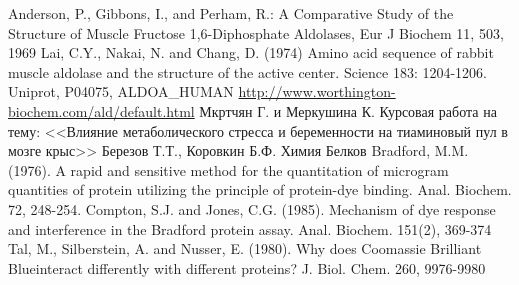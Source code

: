 \begin{thebibliography}{WW}
 Anderson, P., Gibbons, I., and Perham, R.:
    A Comparative Study of the Structure of Muscle Fructose 1,6-Diphosphate Aldolases,
    Eur J Biochem 11, 503, 1969
  Lai, C.Y., Nakai, N. and Chang, D. (1974)
    Amino acid sequence of rabbit muscle aldolase and the structure of the active center.
    Science 183: 1204-1206.
 Uniprot, P04075, ALDOA\_HUMAN
 \url{http://www.worthington-biochem.com/ald/default.html}
 Мкртчян Г. и Меркушина К.
    Курсовая работа  на тему:
    <<Влияние метаболического стресса и беременности на тиаминовый пул в мозге крыс>>
 Березов Т.Т., Коровкин Б.Ф.
    Химия Белков
 Bradford, M.M. (1976).
    A rapid and sensitive method for the quantitation of microgram quantities of
    protein utilizing the principle of protein-dye binding. Anal. Biochem. 72, 248-254.
 Compton, S.J. and Jones, C.G. (1985).
    Mechanism of dye response and interference in the Bradford protein assay.
    Anal. Biochem. 151(2), 369-374
 Tal, M., Silberstein, A. and Nusser, E. (1980).
    Why does Coomassie Brilliant Blue\textregistered interact differently with different proteins?
    J. Biol. Chem. 260, 9976-9980
\end{thebibliography}

